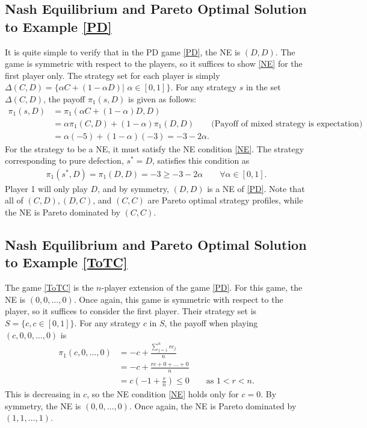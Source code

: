 \subsection{Nash Equilibrium and Pareto Optimal Solution to Example \ref{PD}}


It is quite simple to verify that in the PD game \eqref{PD}, the NE is $(D, D)$. The game is symmetric with respect to the players, so it suffices to show \eqref{NE} for the first player only. The strategy set for each player is simply $\Delta(C,D) = \{\alpha C + (1-\alpha D)|$   $\alpha \in [0,1] \}$.  For any strategy $s$ in the set $\Delta(C,D)$, the payoff $\pi_1(s,D)$ is given as follows: \\
\begin{align*}
\pi_1(s,D) &= \pi_1(\alpha C + (1-\alpha)D,D) \\
&=\alpha \pi_1(C,D) + (1-\alpha) \pi_1(D,D) \qquad \text{(Payoff of mixed strategy is expectation)} \\
&= \alpha (-5) + (1-\alpha)(-3) = -3 -2\alpha. 
\end{align*}
For the strategy to be a NE, it must satisfy the NE condition \eqref{NE}. The strategy corresponding to pure defection, $s^* = D$, satisfies this condition as 
\begin{align*}
    \pi_1(s^*,D) =\pi_1(D,D) = -3 \geq -3-2\alpha  \qquad \forall  \alpha \in [0,1].
\end{align*}
Player 1 will only play $D$, and by symmetry, $(D,D)$ is a NE of \eqref{PD}. Note that all of $(C,D), (D,C)$, and $(C,C)$ are  Pareto optimal strategy profiles, while the NE is Pareto dominated by $(C,C)$.  


\subsection{Nash Equilibrium and Pareto Optimal Solution to Example \ref{ToTC}}

The game \ref{ToTC} is the $n$-player extension of the game \ref{PD}. For this game, the NE is $(0,0,\dots,0)$. Once again, this game is symmetric with respect to the player, so it suffices to consider the first player. Their strategy set is $S = \{c, c \in [0,1] \}$. For any strategy $c$ in $S$, the payoff when playing $(c,0,0,\dots,0)$ is 
\begin{align*}
    \pi_1(c,0,\dots,0) &= -c + \frac{\sum_{j=1}^n rc_j}{n} \\
    &= -c + \frac{rc + 0 + \dots + 0}{n} \\
    &= c\left(-1+\frac{r}{n}\right)\leq0 \qquad \text{as $1<r<n$.}
\end{align*}
This is decreasing in $c$, so the NE condition \eqref{NE} holds only for $c=0$. By symmetry, the NE is $(0,0,\dots,0)$. Once again, the NE is Pareto dominated by $(1,1,\dots,1)$. \\

